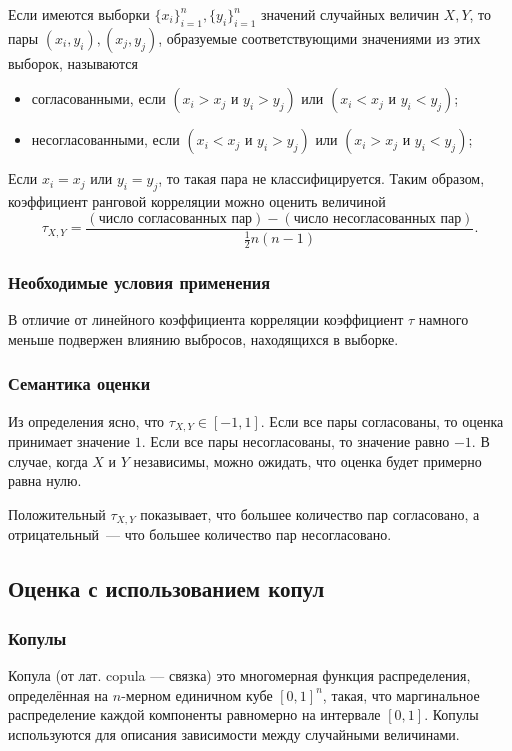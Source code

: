Если имеются выборки $\{x_i\}_{i=1}^n, \{y_i\}_{i=1}^n$ значений случайных величин $X, Y$, то пары $(x_i, y_i), (x_j, y_j)$, образуемые соответствующими значениями из этих выборок, называются
\begin{itemize}
	\item согласованными, если $(x_i > x_j \text{ и } y_i > y_j) \text{ или } (x_i < x_j \text{ и } y_i < y_j)$;
	\item несогласованными, если $(x_i < x_j \text{ и } y_i > y_j) \text{ или } (x_i > x_j \text{ и } y_i < y_j)$;
\end{itemize}
Если $x_i = x_j \text{ или } y_i = y_j$, то такая пара не классифицируется. Таким образом, коэффициент ранговой корреляции можно оценить величиной
\begin{equation}
\tau_{X, Y} = \frac{(\text{число согласованных пар}) - (\text{число несогласованных пар})}{\frac{1}{2}n(n - 1)}.
\end{equation}

\subsubsection*{Необходимые условия применения}
В отличие от линейного коэффициента корреляции коэффициент $\tau$ намного меньше подвержен влиянию выбросов, находящихся в выборке.
\subsubsection*{Семантика оценки}
Из определения ясно, что $\tau_{X, Y} \in [-1, 1]$. Если все пары согласованы, то оценка принимает значение $1$. Если все пары несогласованы, то значение равно $-1$. В случае, когда $X$ и $Y$ независимы, можно ожидать, что оценка будет примерно равна нулю.

Положительный $\tau_{X, Y}$ показывает, что большее количество пар согласовано, а отрицательный~--- что большее количество пар несогласовано.

\subsection*{Оценка с использованием копул}

\subsubsection*{Копулы}
Копула (от лат. copula --- связка) это многомерная функция распределения, определённая на $n$-мерном единичном кубе $[0, 1]^n$, такая, что маргинальное распределение каждой компоненты равномерно на интервале $[0, 1]$. Копулы используются для описания зависимости между случайными величинами.

